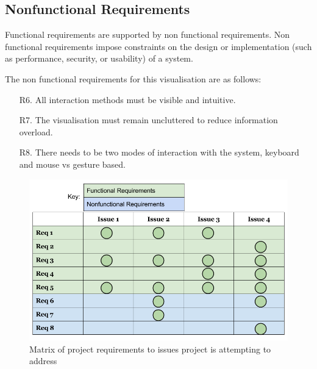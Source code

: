 \subsection{Nonfunctional Requirements}
 Functional requirements are supported by non functional requirements. Non
functional requirements impose constraints on the design or implementation (such
as performance, security, or usability) of a system.
 
 The non functional requirements for this visualisation are as follows:
\begin{enumerate}
 \item[R6.] All interaction methods must be visible and intuitive.

 \item[R7.] The visualisation must remain uncluttered to reduce information overload.

 \item[R8.]  There needs to be two modes of interaction with the system, keyboard and mouse vs gesture based.
\end{enumerate}

\begin{figure}[H]
  \centering
      \includegraphics[width=1\textwidth]{images/issues_to_req_matrix.png}
  \caption{Matrix of project requirements to issues project is attempting to
address}
\end{figure}
